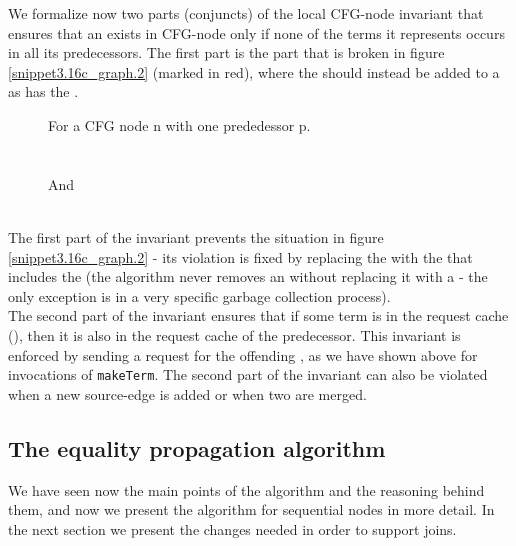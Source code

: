 \bigskip
\noindent
We formalize now two parts (conjuncts) of the local CFG-node invariant that ensures that an \RGFA{} exists in CFG-node only if none of the terms it represents occurs in all its predecessors. The first part is the part that is broken in figure \ref{snippet3.16c_graph.2} (marked in red), where the \RGFA{}  should instead be added to a \GT{} as  has the \GT{} .

\begin{figure}[H]
For a CFG node n with one prededessor p.\\
\\
\\
And\\
\\
\end{figure}



\bigskip
\noindent
The first part of the invariant prevents the situation in figure \ref{snippet3.16c_graph.2} - its violation is fixed by replacing the \RGFA{}  with the \GT{} that includes the \GFA{}  (the algorithm never removes an \RGFA{} without replacing it with a \GFA{} - the only exception is in a very specific garbage collection process).\\
The second part of the invariant ensures that if some term is in the request cache (), then it is also in the request cache of the predecessor. 
This invariant is enforced by sending a request for the offending \GFA{}, as we have shown above for invocations of \lstinline|makeTerm|.
The second part of the invariant can also be violated when a new source-edge is added or when two \GTs{} are merged.

\subsection{The equality propagation algorithm}
We have seen now the main points of the algorithm and the reasoning behind them, and now we present the algorithm for sequential nodes in more detail. In the next section we present the changes needed in order to support joins.

